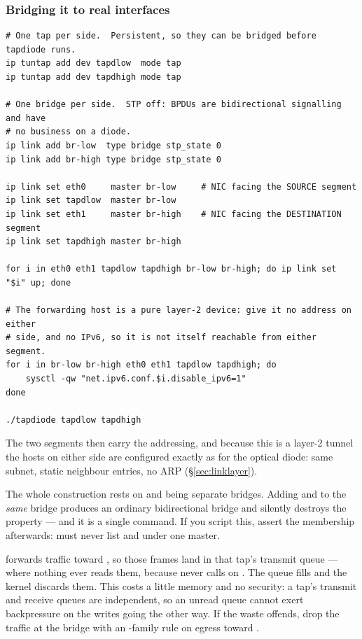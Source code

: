 \documentclass[11pt,a4paper]{article}
\begin{document}
\subsubsection{Bridging it to real interfaces}

\begin{lstlisting}[style=shell,caption={On the forwarding host}]
# One tap per side.  Persistent, so they can be bridged before tapdiode runs.
ip tuntap add dev tapdlow  mode tap
ip tuntap add dev tapdhigh mode tap

# One bridge per side.  STP off: BPDUs are bidirectional signalling and have
# no business on a diode.
ip link add br-low  type bridge stp_state 0
ip link add br-high type bridge stp_state 0

ip link set eth0     master br-low     # NIC facing the SOURCE segment
ip link set tapdlow  master br-low
ip link set eth1     master br-high    # NIC facing the DESTINATION segment
ip link set tapdhigh master br-high

for i in eth0 eth1 tapdlow tapdhigh br-low br-high; do ip link set "$i" up; done

# The forwarding host is a pure layer-2 device: give it no address on either
# side, and no IPv6, so it is not itself reachable from either segment.
for i in br-low br-high eth0 eth1 tapdlow tapdhigh; do
    sysctl -qw "net.ipv6.conf.$i.disable_ipv6=1"
done

./tapdiode tapdlow tapdhigh
\end{lstlisting}

The two segments then carry the addressing, and because this is a layer-2
tunnel the hosts on either side are configured exactly as for the optical
diode: same subnet, static neighbour entries, no ARP (\S\ref{sec:linklayer}).

\begin{notebox}
The whole construction rests on  and  being separate
bridges. Adding  and  to the \emph{same} bridge produces
an ordinary bidirectional bridge and silently destroys the property --- and it
is a single command. If you script this, assert the membership afterwards:
 must never list  and  under one
master.
\end{notebox}

\begin{notebox}
 forwards \dstside{} traffic toward , so those
frames land in that tap's transmit queue --- where nothing ever reads them,
because  never calls  on . The queue
fills and the kernel discards them. This costs a little memory and no
security: a tap's transmit and receive queues are independent, so an unread
queue cannot exert backpressure on the writes going the other way. If the
waste offends, drop the traffic at the bridge with an 
-family rule on egress toward .
\end{notebox}
\end{document}
